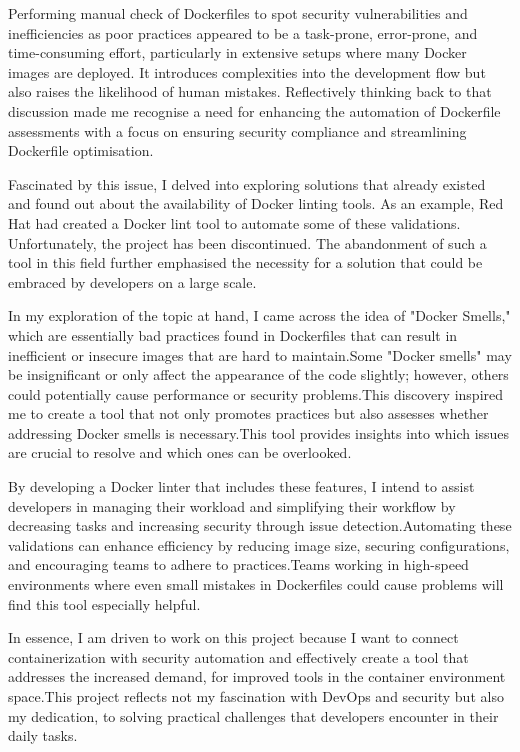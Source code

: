 Performing manual check of Dockerfiles to spot security vulnerabilities and inefficiencies as poor practices appeared to be a task-prone, error-prone, and time-consuming effort, particularly in extensive setups where many Docker images are deployed. It introduces complexities into the development flow but also raises the likelihood of human mistakes. Reflectively thinking back to that discussion made me recognise a need for enhancing the automation of Dockerfile assessments with a focus on ensuring security compliance and streamlining Dockerfile optimisation. 

Fascinated by this issue, I delved into exploring solutions that already existed and found out about the availability of Docker linting tools. As an example, Red Hat had created a Docker lint tool to automate some of these validations. Unfortunately, the project has been discontinued. The abandonment of such a tool in this field further emphasised the necessity for a solution that could be embraced by developers on a large scale. 

In my exploration of the topic at hand, I came across the idea of "Docker Smells," which are essentially bad practices found in Dockerfiles that can result in inefficient or insecure images that are hard to maintain.Some "Docker smells" may be insignificant or only affect the appearance of the code slightly; however, others could potentially cause performance or security problems.This discovery inspired me to create a tool that not only promotes practices but also assesses whether addressing Docker smells is necessary.This tool provides insights into which issues are crucial to resolve and which ones can be overlooked. 

By developing a Docker linter that includes these features, I intend to assist developers in managing their workload and simplifying their workflow by decreasing tasks and increasing security through issue detection.Automating these validations can enhance efficiency by reducing image size, securing configurations, and encouraging teams to adhere to practices.Teams working in high-speed environments where even small mistakes in Dockerfiles could cause problems will find this tool especially helpful.

In essence, I am driven to work on this project because I want to connect containerization with security automation and effectively create a tool that addresses the increased demand, for improved tools in the container environment space.This project reflects not my fascination with DevOps and security but also my dedication, to solving practical challenges that developers encounter in their daily tasks.  



